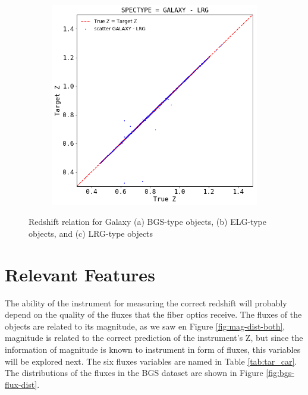 \begin{figure}[!htbp]
\begin{subfigure}[b]{0.5\textwidth}
		\caption{}
		\label{fig:ELG-z-truez}
	\end{subfigure}
	\begin{subfigure}[b]{0.5\textwidth}
		\includegraphics[width=1\linewidth]{TeX_files/Imagenes/LRG-z-truez}
		\caption{}
		\label{fig:LRG-z-truez}
	\end{subfigure}
	\caption{ Redshift relation for Galaxy (a) BGS-type objects, (b) ELG-type objects, and (c) LRG-type objects }
	\label{fig:GALAXY-SUB-z-truez}
\end{figure}

\section{Relevant Features}
The ability of the instrument for measuring the correct redshift will probably depend on the quality of the fluxes that the fiber optics receive. The fluxes of the objects are related to its magnitude, as we saw en Figure \ref{fig:mag-dist-both}, magnitude is related to the correct prediction of the instrument's Z, but since the information of magnitude is known to instrument in form of fluxes, this variables will be explored next. The six fluxes variables are named in Table \ref{tab:tar_car}.  The distributions of the fluxes in the BGS dataset are shown in Figure \ref{fig:bgs-flux-dist}.


